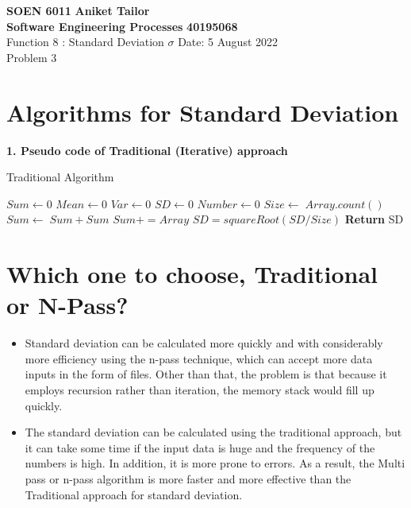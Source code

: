 \documentclass[a4paper, 12pt]{article}
\begin{document}
\noindent
\large\textbf{SOEN 6011} \hfill \textbf{Aniket Tailor}\\
\large\textbf{Software Engineering Processes} \hfill \textbf{40195068} \\
Function 8 : Standard Deviation $\sigma$ \hfill Date: 5 August 2022\\
\normalsize Problem 3 \\
\section*{Algorithms for Standard Deviation}
\textbf{1. Pseudo code of Traditional (Iterative) approach}\\

\begin{algorithm}
\caption{Traditional Algorithm}

\begin{algorithmic}[1]

    \State $Sum \leftarrow 0$
    \State $Mean \leftarrow 0$
    \State $Var \leftarrow 0$
    \State $SD \leftarrow 0$
    \State $Number \leftarrow 0$
    \State $Size \leftarrow \;Array.count()$
    \State $Sum \leftarrow \;Sum+Sum$
    \State $Sum+=Array$
    \EndFor
    \State $SD=squareRoot(SD/Size)$
    \State \textbf{Return} SD
    \EndProcedure
\Statex
\end{algorithmic}
\end{algorithm}

\section*{Which one to choose, Traditional or N-Pass?}
\begin{itemize}[noitemsep]
        \item Standard deviation can be calculated more quickly and with considerably more efficiency using the n-pass technique, which can accept more data inputs in the form of files. Other than that, the problem is that because it employs recursion rather than iteration, the memory stack would fill up quickly.
        \item The standard deviation can be calculated using the traditional approach, but it can take some time if the input data is huge and the frequency of the numbers is high. In addition, it is more prone to errors. As a result, the Multi pass or n-pass algorithm is more faster and more effective than the Traditional approach for standard deviation.

    \end{itemize}
\end{document}
